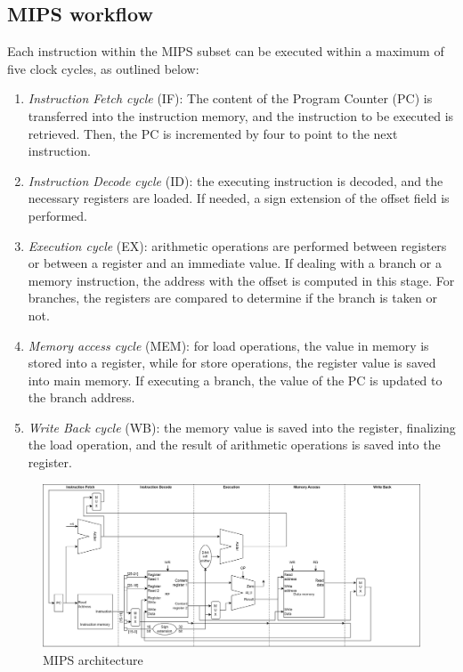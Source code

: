 \subsection{MIPS workflow}
Each instruction within the MIPS subset can be executed within a maximum of five clock cycles, as outlined below:
\begin{enumerate}
    \item \textit{Instruction Fetch cycle} (IF): The content of the Program Counter (PC) is transferred into the instruction memory, and the instruction to be executed is retrieved. 
        Then, the PC is incremented by four to point to the next instruction.
    \item \textit{Instruction Decode cycle} (ID): the executing instruction is decoded, and the necessary registers are loaded. 
        If needed, a sign extension of the offset field is performed.
    \item \textit{Execution cycle} (EX): arithmetic operations are performed between registers or between a register and an immediate value. 
        If dealing with a branch or a memory instruction, the address with the offset is computed in this stage. 
        For branches, the registers are compared to determine if the branch is taken or not.
    \item \textit{Memory access cycle} (MEM): for load operations, the value in memory is stored into a register, while for store operations, the register value is saved into main memory. 
        If executing a branch, the value of the PC is updated to the branch address.
    \item \textit{Write Back cycle} (WB): the memory value is saved into the register, finalizing the load operation, and the result of arithmetic operations is saved into the register.
\end{enumerate}
\begin{figure}[H]
    \centering
    \includegraphics[width=1\linewidth]{images/mips.png}
    \caption{MIPS architecture}
\end{figure}


